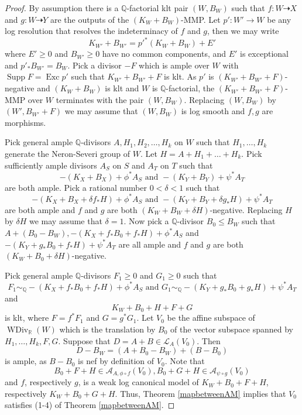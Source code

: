 \begin{proof}
  By assumption there is a $\mathbb{Q}$-factorial klt pair $(W,B_{W})$ such that $f:W\dashrightarrow X$ and $g:W \dashrightarrow Y$ are the outputs of the $(K_{W}+B_{W})$-MMP. Let $p':W'\to W$ be any log resolution  that resolves the indeterminacy of $f$ and $g$, then we may write
  \[
    K_{W'}+B_{W'}=p'^*(K_{W}+B_{W})+E'
  \]
  where $E'\geqslant 0$ and $B_{W'}\geqslant 0$ have no common components, and $E'$ is exceptional and $p'_*B_{W'}=B_{W}$. Pick a divisor $-F$ which is ample over $W$ with $\operatorname{Supp}F=\operatorname{Exc}p'$ such that $K_{W'}+B_{W'}+F$ is klt. As $p'$ is $(K_{W'}+
    B_{W'}+F)$-negative and $(K_{W}+B_{W})$ is klt and $W$ is $\mathbb{Q}$-factorial, the $(K_{W'}+B_{W'}+F)$-MMP over $W$ terminates with the pair $(W,B_{W})$. Replacing $(W,B_{W})$ by $(W',B_{W'} +F)$ we may assume that $(W,B_{W})$ is log smooth and $f,g$ are morphisms.

  Pick general ample $\mathbb{Q}$-divisors $A, H_{1},H_{2},\ldots ,H_{k}$ on $W$ such that $H_{1},\ldots , H_{k}$ generate the Neron-Severi group of $W$. Let $H=A+H_{1}+\ldots+ H_{k}$. Pick sufficiently ample divisors $A_{S}$ on $S$ and $A_{T}$ on $T$ such that
  \[
    -(K_{X}+B_{X})+\phi^*A_{S} \text{ and } -(K_{Y}+B_{Y})+\psi^*A_{T}
  \]
  are both ample. Pick a rational number $0<\delta<1$ such that
  \[
    -(K_{X}+B_{X}+\delta f_*H)+\phi^*A_{S} \text{ and } -(K_{Y}+B_{Y}+\delta g_*H)+\psi^*A_{T}
  \]
  are both ample and  $f$ and  $g$ are both  $(K_{W}+B_{W}+\delta H)$-negative. Replacing $H$ by $\delta H$ we may assume that $\delta=1$. Now pick a $\mathbb{Q}$-divisor $B_{0}\leqslant B_{W}$ such that $A+(B_{0}-B_{W}), -(K_{X}+ f_*B_{0}+f_*H)+\phi^*A_{S}$ and $-(K_{Y}+ g_*B_{0}+f_*H)+\psi^*A_{T}$  are all ample and $f$ and  $g$ are both  $(K_{W}+B_{0}+\delta H)$-negative.

  Pick general ample $\mathbb{Q}$-divisors $F_{1}\geqslant 0$ and $G_{1}\geqslant 0$  such that
  \[
    F_{1}\sim_{\mathbb{Q}} -(K_{X}+f_*B_{0}+ f_*H)+\phi^*A_{S} \text{ and } G_{1}\sim_{\mathbb{Q}} -(K_{Y}+g_*B_{0}+ g_*H)+\psi^*A_{T}
  \]
  and
  \[
    K_{W}+B_{0}+H+F+G
  \]
  is klt, where $F=f^*F_{1}$ and $G=g^*G_{1}$.
  Let $V_{0}$ be the affine subspace of $\operatorname{WDiv}_{\mathbb{R}}(W)$ which is the translation by $B_{0}$ of the vector subspace  spanned by $H_{1},\ldots , H_{k},F,G$. Suppose that $D=A+B \in \mathcal{L}_{A}(V_{0})$. Then
  \[
    D-B_W=(A+B_{0}-B_{W})+(B-B_{0})
  \]
  is ample, as $B-B_{0}$ is nef by definition of $V_{0}$. Note that
  \[
    B_{0}+F+H \in \mathcal{A}_{A,\phi\circ f}(V_{0}), B_{0}+G+H \in \mathcal{A}_{\psi \circ g}(V_{0})
  \]
  and $f$, respectively $g$, is a weak log canonical model of $K_{W}+B_{0}+F+H$, respectively $K_{W}+B_{0}+G+H$. Thus, Theorem \ref{mapbetweenAM} implies that $V_{0}$ satisfies (1-4) of Theorem \ref{mapbetweenAM}.


\end{proof}
